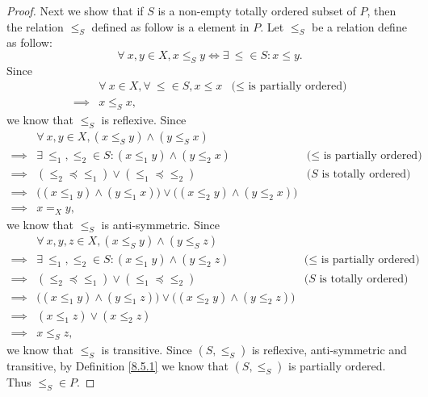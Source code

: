 \begin{proof}
    Next we show that if \(S\) is a non-empty totally ordered subset of \(P\), then the relation \(\leq_S\) defined as follow is a element in \(P\).
    Let \(\leq_S\) be a relation define as follow:
    \[
        \forall\ x, y \in X, x \leq_S y \iff \exists\ \leq \in S : x \leq y.
    \]
    Since
    \begin{align*}
                 & \forall\ x \in X, \forall\ \leq \in S, x \leq x & \text{(\(\leq\) is partially ordered)} \\
        \implies & x \leq_S x,
    \end{align*}
    we know that \(\leq_S\) is reflexive.
    Since
    \begin{align*}
                 & \forall\ x, y \in X, (x \leq_S y) \land (y \leq_S x)                                                                              \\
        \implies & \exists\ \leq_1, \leq_2 \in S : (x \leq_1 y) \land (y \leq_2 x)                          & \text{(\(\leq\) is partially ordered)} \\
        \implies & (\leq_2 \preceq \leq_1) \lor (\leq_1 \preceq \leq_2)                                     & \text{(\(S\) is totally ordered)}      \\
        \implies & \big((x \leq_1 y) \land (y \leq_1 x)\big) \lor \big((x \leq_2 y) \land (y \leq_2 x)\big)                                          \\
        \implies & x =_X y,
    \end{align*}
    we know that \(\leq_S\) is anti-symmetric.
    Since
    \begin{align*}
                 & \forall\ x, y, z \in X, (x \leq_S y) \land (y \leq_S z)                                                                           \\
        \implies & \exists\ \leq_1, \leq_2 \in S : (x \leq_1 y) \land (y \leq_2 z)                          & \text{(\(\leq\) is partially ordered)} \\
        \implies & (\leq_2 \preceq \leq_1) \lor (\leq_1 \preceq \leq_2)                                     & \text{(\(S\) is totally ordered)}      \\
        \implies & \big((x \leq_1 y) \land (y \leq_1 z)\big) \lor \big((x \leq_2 y) \land (y \leq_2 z)\big)                                          \\
        \implies & (x \leq_1 z) \lor (x \leq_2 z)                                                                                                    \\
        \implies & x \leq_S z,
    \end{align*}
    we know that \(\leq_S\) is transitive.
    Since \((S, \leq_S)\) is reflexive, anti-symmetric and transitive, by Definition \ref{8.5.1} we know that \((S, \leq_S)\) is partially ordered.
    Thus \(\leq_S \in P\).


\end{proof}
